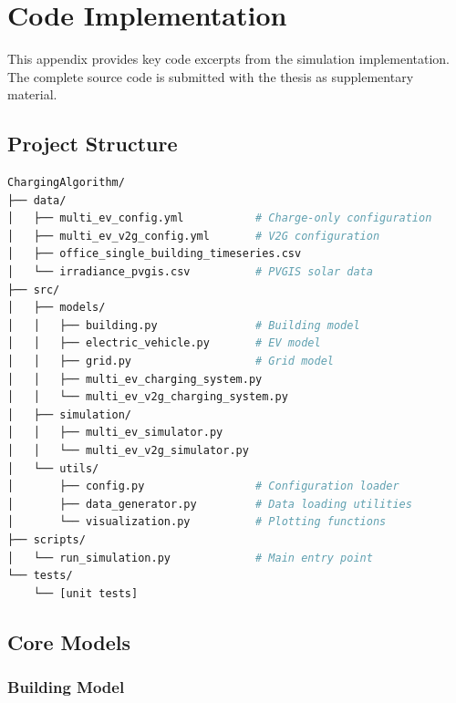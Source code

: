 \chapter{Code Implementation}
\label{app:code}

This appendix provides key code excerpts from the simulation implementation. The complete source code is submitted with the thesis as supplementary material.

\section{Project Structure}
\label{app:structure}

\begin{lstlisting}[language=bash,caption={Project directory structure}]
ChargingAlgorithm/
├── data/
│   ├── multi_ev_config.yml           # Charge-only configuration
│   ├── multi_ev_v2g_config.yml       # V2G configuration
│   ├── office_single_building_timeseries.csv
│   └── irradiance_pvgis.csv          # PVGIS solar data
├── src/
│   ├── models/
│   │   ├── building.py               # Building model
│   │   ├── electric_vehicle.py       # EV model
│   │   ├── grid.py                   # Grid model
│   │   ├── multi_ev_charging_system.py
│   │   └── multi_ev_v2g_charging_system.py
│   ├── simulation/
│   │   ├── multi_ev_simulator.py
│   │   └── multi_ev_v2g_simulator.py
│   └── utils/
│       ├── config.py                 # Configuration loader
│       ├── data_generator.py         # Data loading utilities
│       └── visualization.py          # Plotting functions
├── scripts/
│   └── run_simulation.py             # Main entry point
└── tests/
    └── [unit tests]
\end{lstlisting}

\section{Core Models}
\label{app:core_models}

\subsection{Building Model}

